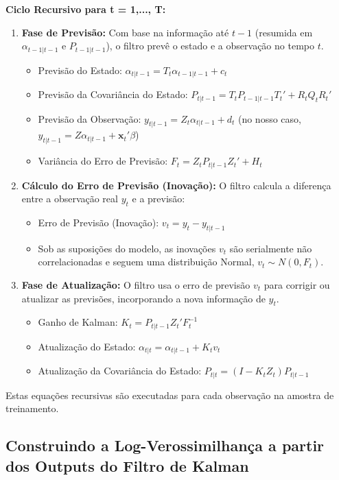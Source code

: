 \documentclass[ 12pt,a4paper ]{article} %
\begin{document}
	\textbf{Ciclo Recursivo para t = 1,..., T:}
	\begin{enumerate}
		\item \textbf{Fase de Previsão:} Com base na informação até $t-1$ (resumida em $\alpha_{t-1|t-1}$ e $P_{t-1|t-1}$), o filtro prevê o estado e a observação no tempo $t$.
		\begin{itemize}
			\item Previsão do Estado: $\alpha_{t|t-1} = T_t \alpha_{t-1|t-1} + c_t$
			\item Previsão da Covariância do Estado: $P_{t|t-1} = T_t P_{t-1|t-1} T_t' + R_t Q_t R_t'$
			\item Previsão da Observação: $y_{t|t-1} = Z_t \alpha_{t|t-1} + d_t$ (no nosso caso, $y_{t|t-1} = Z\alpha_{t|t-1} + \mathbf{x}_t'\beta$)
			\item Variância do Erro de Previsão: $F_t = Z_t P_{t|t-1} Z_t' + H_t$
		\end{itemize}
		
		\item \textbf{Cálculo do Erro de Previsão (Inovação):} O filtro calcula a diferença entre a observação real $y_t$ e a previsão:
		\begin{itemize}
			\item Erro de Previsão (Inovação): $v_t = y_t - y_{t|t-1}$
			\item Sob as suposições do modelo, as inovações $v_t$ são serialmente não correlacionadas e seguem uma distribuição Normal, $v_t \sim N(0, F_t)$.
		\end{itemize}
		
		\item \textbf{Fase de Atualização:} O filtro usa o erro de previsão $v_t$ para corrigir ou atualizar as previsões, incorporando a nova informação de $y_t$.
		\begin{itemize}
			\item Ganho de Kalman: $K_t = P_{t|t-1} Z_t' F_t^{-1}$
			\item Atualização do Estado: $\alpha_{t|t} = \alpha_{t|t-1} + K_t v_t$
			\item Atualização da Covariância do Estado: $P_{t|t} = (I - K_t Z_t) P_{t|t-1}$
		\end{itemize}
	\end{enumerate}
	
	Estas equações recursivas são executadas para cada observação na amostra de treinamento.
	
	\subsection{Construindo a Log-Verossimilhança a partir dos Outputs do Filtro de Kalman}
	
\end{document}
